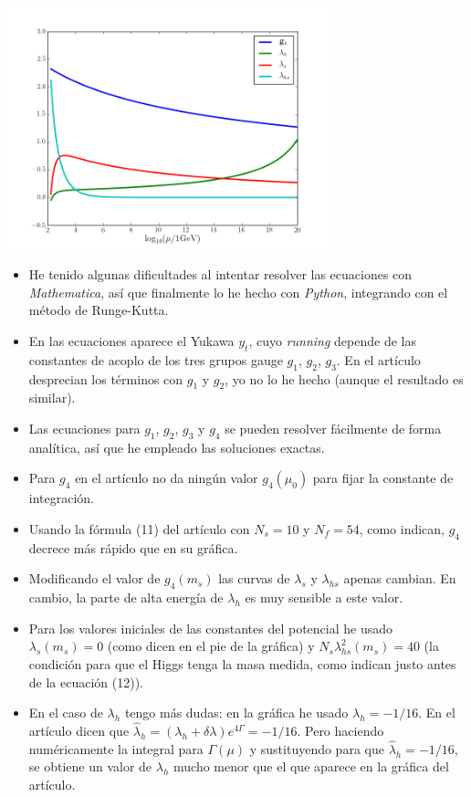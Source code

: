 \documentclass[11pt, a4paper]{article}
\begin{document}
\centering
\includegraphics[width=0.7\textwidth]{running}
\begin{itemize}
\item He tenido algunas dificultades al intentar resolver las ecuaciones con \textit{Mathematica}, así que finalmente lo he hecho con \textit{Python}, integrando con el método de Runge-Kutta.
\item En las ecuaciones aparece el Yukawa $y_t$, cuyo \textit{running} depende de las constantes de acoplo de los tres grupos gauge $g_1$, $g_2$, $g_3$. En el artículo desprecian los términos con $g_1$ y $g_2$, yo no lo he hecho (aunque el resultado es similar).
\item Las ecuaciones para $g_1$, $g_2$, $g_3$ y $g_4$ se pueden resolver fácilmente de forma analítica, así que he empleado las soluciones exactas.
\item Para $g_4$ en el artículo no da ningún valor $g_4(\mu_0)$ para fijar la constante de integración.
\item Usando la fórmula (11) del artículo con $N_s=10$ y $N_f=54$, como indican, $g_4$ decrece más rápido que en su gráfica.
\item Modificando el valor de $g_4(m_s)$ las curvas de $\lambda_s$ y $\lambda_{hs}$ apenas cambian. En cambio, la parte de alta energía de $\lambda_h$ es muy sensible a este valor. 
\item Para los valores iniciales de las constantes del potencial he usado $\lambda_s(m_s) = 0$ (como dicen en el pie de la gráfica) y $N_s \lambda_{hs}^2(m_s) = 40$ (la condición para que el Higgs tenga la masa medida, como indican justo antes de la ecuación (12)). 
\item En el caso de $\lambda_h$ tengo más dudas: en la gráfica he usado $\lambda_h=-1/16$. En el artículo dicen que $\hat{\lambda}_h = (\lambda_h + \delta \lambda)e^{4\Gamma}=-1/16$.  Pero haciendo numéricamente la integral para $\Gamma(\mu)$ y sustituyendo para que $\hat{\lambda}_h = -1/16$, se obtiene un valor de $\lambda_h$ mucho menor que el que aparece en la gráfica del artículo. 
\end{itemize}
\end{document}
